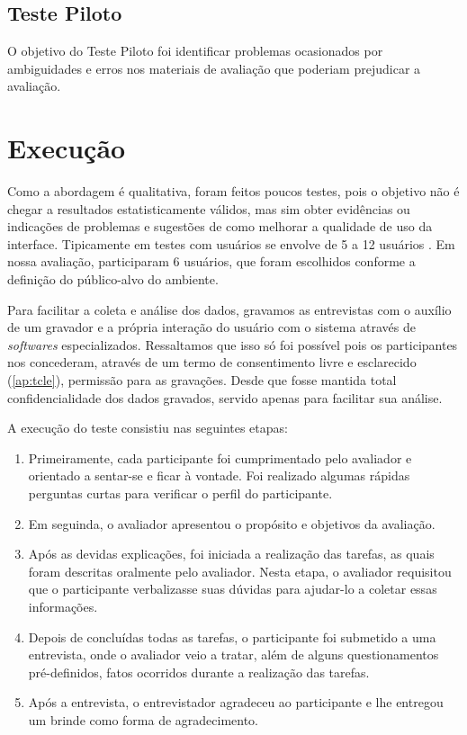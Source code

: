 \subsection{Teste Piloto}

O objetivo do Teste Piloto foi identificar problemas ocasionados por ambiguidades e erros nos materiais de avaliação que poderiam prejudicar a avaliação. 

\section{Execução}

Como a abordagem é qualitativa, foram feitos poucos testes, pois o objetivo não é chegar a resultados estatisticamente válidos, mas sim obter evidências ou indicações de problemas e sugestões de como melhorar a qualidade de uso da interface. Tipicamente em testes com usuários se envolve de 5 a 12 usuários \cite{dumas1999practical}. Em nossa avaliação, participaram 6 usuários, que foram escolhidos conforme a definição do público-alvo do ambiente.

Para facilitar a coleta e análise dos dados, gravamos as entrevistas com o auxílio de um gravador e a própria interação do usuário com o sistema através de \textit{softwares} especializados. Ressaltamos que isso só foi possível pois os participantes nos concederam, através de um termo de consentimento livre e esclarecido (\autoref{ap:tcle}), permissão para as gravações. Desde que fosse mantida total confidencialidade dos dados gravados, servido apenas para facilitar sua análise.

A execução do teste consistiu nas seguintes etapas:
\begin{enumerate}
	\item Primeiramente, cada participante foi cumprimentado pelo avaliador e orientado a sentar-se e ficar à vontade. Foi realizado algumas rápidas perguntas curtas para verificar o perfil do participante.
	\item Em seguinda, o avaliador apresentou o propósito e objetivos da avaliação.   
	\item Após as devidas explicações, foi iniciada a realização das tarefas, as quais foram descritas oralmente pelo avaliador. Nesta etapa, o avaliador requisitou que o participante verbalizasse suas dúvidas para ajudar-lo a coletar essas informações.
	\item Depois de concluídas todas as tarefas, o participante foi submetido a uma entrevista, onde o avaliador veio a tratar, além de alguns questionamentos pré-definidos, fatos ocorridos durante a realização das tarefas.
	\item Após a entrevista, o entrevistador agradeceu ao participante e lhe entregou um brinde como forma de agradecimento.  
\end{enumerate}

